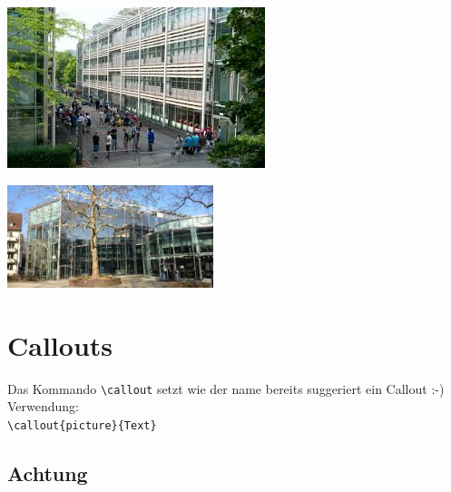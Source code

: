 \blindtext

\begin{addmargin}[-\marginWidthPlusSep]{0pt}
   	\includegraphics[width=\dimexpr\textwidth+\marginWidthPlusSep]{Kapitel/Bilder/gibbBmSchulhausMitSchuelern}
   	\label{fig:figur2}    	
\end{addmargin}


\begin{addmargin}[-\marginWidthPlusSep]{0pt}
	\begin{minipage}{60mm}
		\includegraphics[width=60mm]{Kapitel/Bilder/gibbiet}
		\label{fig:Testbild1}
	\end{minipage}\hfill
	\begin{minipage}{\dimexpr\textwidth+\marginWidthPlusSep-70mm} %
		\blindtext
	\end{minipage}   	
\end{addmargin}

\section{Callouts}

Das Kommando \lstinline$\callout$ setzt wie der name bereits suggeriert ein Callout :-)\\
Verwendung:\\
\lstinline$\callout{picture}{Text}$

\subsection{Achtung}

